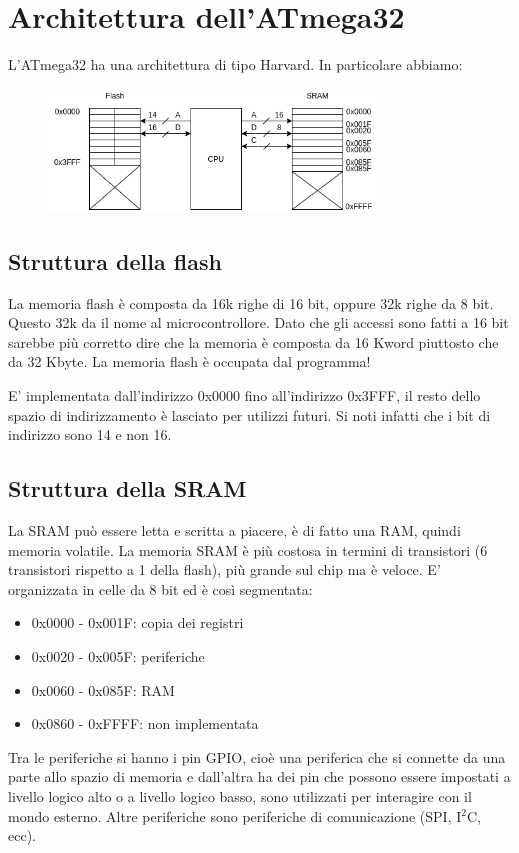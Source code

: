 \section{Architettura dell'ATmega32}
L'ATmega32 ha una architettura di tipo Harvard. In particolare abbiamo:
\begin{figure}[H]
    \centering
    \includegraphics[width=330px]{images/3_Architettura_ATmega32/ATmega32.png}
\end{figure}

\subsection{Struttura della flash}
La memoria flash è composta da 16k righe di 16 bit, oppure 32k righe da 8 bit.
Questo 32k da il nome al microcontrollore.
Dato che gli accessi sono fatti a 16 bit sarebbe più corretto dire che la memoria è composta da 16 Kword piuttosto che da 32 Kbyte.
La memoria flash è occupata dal programma!

E' implementata dall'indirizzo 0x0000 fino all'indirizzo 0x3FFF, il resto dello spazio di indirizzamento è lasciato per utilizzi futuri. Si noti infatti che i bit di indirizzo sono 14 e non 16.

\subsection{Struttura della SRAM}
La SRAM può essere letta e scritta a piacere, è di fatto una RAM, quindi memoria volatile.
La memoria SRAM è più costosa in termini di transistori (6 transistori rispetto a 1 della flash), più grande sul chip ma è veloce. E' organizzata in celle da 8 bit ed è così segmentata:
\begin{itemize}
    \item 0x0000 - 0x001F: copia dei registri
    \item 0x0020 - 0x005F: periferiche
    \item 0x0060 - 0x085F: RAM
    \item 0x0860 - 0xFFFF: non implementata
\end{itemize}

Tra le periferiche si hanno i pin GPIO, cioè una periferica che si connette da una parte allo spazio di memoria e dall'altra ha dei pin che possono essere impostati a livello logico alto o a livello logico basso, sono utilizzati per interagire con il mondo esterno. Altre periferiche sono periferiche di comunicazione (SPI, I$^{2}$C, ecc).

